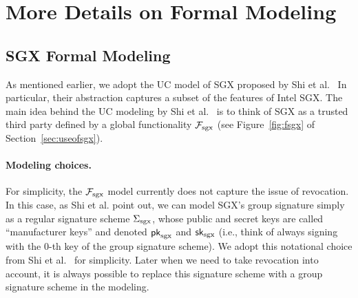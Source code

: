 


\newcommand{\ucstring}[1]{{\color{black} #1}}

\section{More Details on Formal Modeling} 
\subsection{SGX Formal Modeling}
\label{sec:sgxmodel}


As mentioned earlier, we adopt the 
UC model of SGX proposed by Shi et al.~\cite{sgxsok}
In particular, their 
abstraction captures a subset of the features 
of Intel SGX. 
The main idea behind the UC modeling by Shi et al.~\cite{sgxsok}
is to think of SGX 
as a trusted third party defined by 
a global functionality $\mathcal{F}_{\textrm{sgx}}$ (see Figure~\ref{fig:fsgx} of 
Section~\ref{sec:useofsgx}).

\paragraph{Modeling choices.}
For simplicity, the $\mathcal{F}_{\textrm{sgx}}$ model currently does not 
capture the issue of revocation.
In this case, as Shi et al. point out, 
we can model SGX's group signature
simply as a regular signature scheme ${\Sigma_{\textrm{sgx}}}$, whose
public and secret keys 
are called ``manufacturer keys'' and denoted ${\sf pk}_{\mathrm{sgx}}$ and ${\sf sk}_{\mathrm{sgx}}$ 
(i.e., think of always signing 
with the 0-th key of the group signature scheme).
We adopt this notational choice from Shi et al.~\cite{sgxsok} %
for simplicity. Later when 
we need to take revocation into account,
it is always possible to replace this signature 
scheme with a group signature scheme in the modeling.


